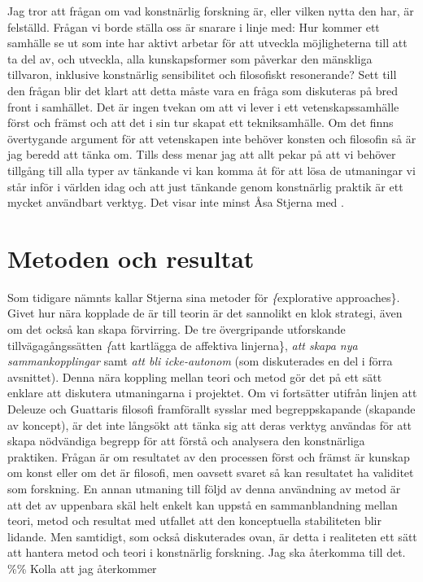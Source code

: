\documentclass[11pt]{article}
\begin{document}
Jag tror att frågan om vad konstnärlig forskning är, eller vilken nytta
den har, är felställd. Frågan vi borde ställa oss är snarare i linje
med: Hur kommer ett samhälle se ut som inte har aktivt arbetar för att
utveckla möjligheterna till att ta del av, och utveckla, alla
kunskapsformer som påverkar den mänskliga tillvaron, inklusive
konstnärlig sensibilitet och filosofiskt resonerande? Sett till den
frågan blir det klart att detta måste vara en fråga som diskuteras på
bred front i samhället. Det är ingen tvekan om att vi lever i ett
vetenskapssamhälle först och främst och att det i sin tur skapat ett
tekniksamhälle. Om det finns övertygande argument för att vetenskapen
inte behöver konsten och filosofin så är jag beredd att tänka om. Tills
dess menar jag att allt pekar på att vi behöver tillgång till alla typer
av tänkande vi kan komma åt för att lösa de utmaningar vi står inför i
världen idag och att just tänkande genom konstnärlig praktik är ett
mycket användbart verktyg. Det visar inte minst Åsa Stjerna med .


\section*{Metoden och resultat}
\label{sec:orgc2861a5}
Som tidigare nämnts kallar Stjerna sina metoder för \emph\{explorative
    approaches\}. Givet hur nära kopplade de är till teorin är det
sannolikt en klok strategi, även om det också kan skapa förvirring. De
tre övergripande utforskande tillvägagångssätten \emph\{att kartlägga
    de affektiva linjerna\}, \emph{att skapa nya sammankopplingar} samt
\emph{att bli icke-autonom} (som diskuterades en del i förra
avsnittet). Denna nära koppling mellan teori och metod gör det på ett
sätt enklare att diskutera utmaningarna i projektet. Om vi fortsätter
utifrån linjen att Deleuze och Guattaris filosofi framförallt sysslar
med begreppskapande (skapande av koncept), är det inte långsökt att
tänka sig att deras verktyg användas för att skapa nödvändiga begrepp
för att förstå och analysera den konstnärliga praktiken. Frågan är om
resultatet av den processen först och främst är kunskap om konst eller
om det är filosofi, men oavsett svaret så kan resultatet ha validitet
som forskning. En annan utmaning till följd av denna användning av
metod är att det av uppenbara skäl helt enkelt kan uppstå en
sammanblandning mellan teori, metod och resultat med utfallet att den
konceptuella stabiliteten blir lidande. Men samtidigt, som också
diskuterades ovan, är detta i realiteten ett sätt att hantera metod
och teori i konstnärlig forskning. Jag ska återkomma till
det. \%\% Kolla att jag återkommer
\end{document}

